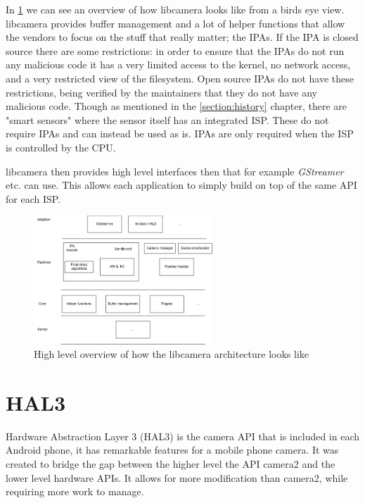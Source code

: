 In \cref{fig:libcameraarch} we can see an overview of how libcamera looks like
from a birds eye view. libcamera provides buffer management and a lot of helper
functions that allow the vendors to focus on the stuff that really matter; the
IPAs. If the IPA is closed source there are some restrictions: in order to
ensure that the IPAs do not run any malicious code it has a very limited access
to the kernel, no network access, and a very restricted view of the filesystem.
Open source IPAs do not have these restrictions, being verified by the
maintainers that they do not have any malicious code. Though as mentioned in
the \cref{section:history} chapter, there are "smart sensors" where the
sensor itself has an integrated ISP. These do not require IPAs and can instead
be used as is. IPAs are only required when the ISP is controlled by the CPU.

libcamera then provides high level interfaces then that for example
\textit{GStreamer} etc. can use. This allows each application to simply build on top
of the same API for each ISP.

\begin{figure}
    \begin{center}
        \includegraphics[width=0.60\textwidth]{figures/libcameraarch.png}
    \end{center}
    \caption{High level overview of how the libcamera architecture looks like}
    \label{fig:libcameraarch}
\end{figure}


\section{HAL3}
Hardware Abstraction Layer 3 (HAL3) is the camera API that is included in each
Android phone, it has remarkable features for a mobile phone camera. It was
created to bridge the gap between the higher level the API camera2 and the
lower level hardware APIs. It allows for more modification than camera2, while
requiring more work to manage.

